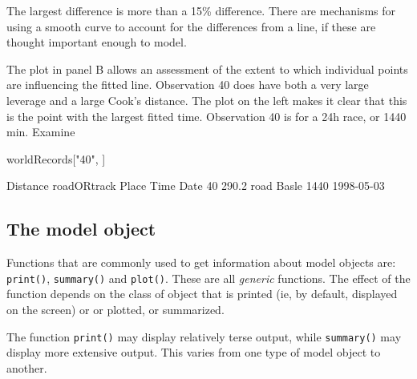 \documentclass{tufte-book}\usepackage[]{graphicx}\usepackage[]{color}
\newcommand{\txtt}[1]{\texttt{#1}}
\begin{document}
\pagebreak
The largest difference is more than a 15\% difference. There are
mechanisms for using a smooth curve to account for the differences
from a line, if these are thought important enough to model.

The plot in panel B allows an assessment of the extent to which individual
points are influencing the fitted line.  Observation 40 does have both
a very large leverage and a large Cook's distance.  The plot on the
left makes it clear that this is the point with the largest fitted
time. Observation 40 is for a 24h race, or 1440 min. Examine
\begin{Schunk}
\begin{Sinput}
worldRecords["40", ]
\end{Sinput}
\begin{Soutput}
   Distance roadORtrack Place Time       Date
40    290.2        road Basle 1440 1998-05-03
\end{Soutput}
\end{Schunk}

\subsection{The model object}\label{ss:modobj}

Functions that are commonly used to get information
about model objects are: \txtt{print()}, \txtt{summary()} and
\txtt{plot()}.  These are all \textit{generic} functions. The effect
of the function depends on the class of object that is printed (ie, by
default, displayed on the screen) or or plotted, or summarized.

The function \txtt{print()} may display relatively terse
output, while \txtt{summary()} may display more extensive output.
This varies from one type of model object to another.
\end{document}
